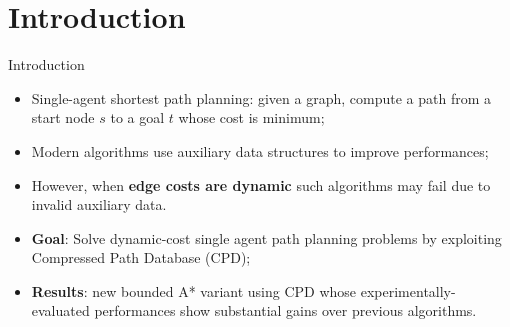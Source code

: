 \section*{Introduction}

\begin{frame}{Introduction}
    \begin{itemize}
        \item Single-agent shortest path planning: given a graph, compute a path from a start node $s$ to a goal $t$ whose cost is minimum;
        \item Modern algorithms use auxiliary data structures to improve performances;
        \item However, when \textbf{edge costs are dynamic} such algorithms may fail due to invalid auxiliary data.

        \item \textbf{Goal}: Solve dynamic-cost single agent path planning problems by exploiting Compressed Path Database (CPD);
        \item \textbf{Results}: new bounded A* variant using CPD whose experimentally-evaluated performances show substantial gains over previous algorithms.
    \end{itemize}
\end{frame}

